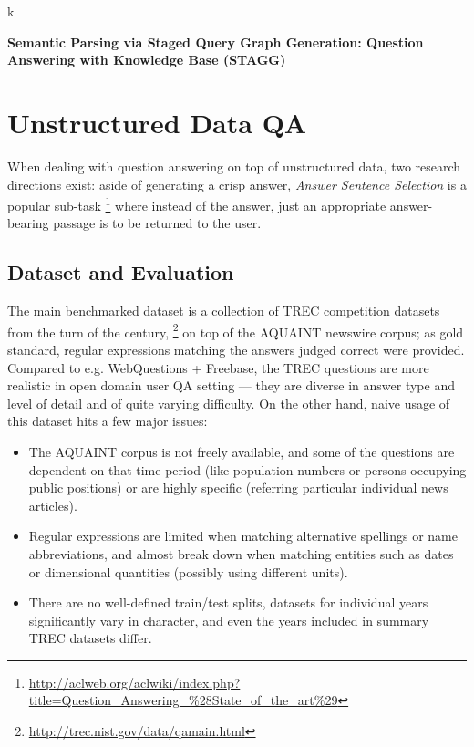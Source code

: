 \citep{Semantic2014Bordes}

\citep{FreebaseQA2014Yao}

\citep{MTBao2014}
k

\citep{Aqqu}

\textbf{Semantic Parsing via Staged Query Graph Generation: Question Answering with Knowledge Base (STAGG)} \citep{STAGG}



\section{Unstructured Data QA}
\label{sec:unstructured}

When dealing with question answering on top of unstructured data,
two research directions exist: aside of generating a crisp answer,
\textit{Answer Sentence Selection} is a popular sub-task%
\footnote{\url{http://aclweb.org/aclwiki/index.php?title=Question_Answering_\%28State_of_the_art\%29}}
where instead of the answer, just an appropriate answer-bearing passage
is to be returned to the user.

\subsection{Dataset and Evaluation}

The main benchmarked dataset is a collection of TREC competition datasets
from the turn of the century,%
\footnote{\url{http://trec.nist.gov/data/qamain.html}}
on top of the AQUAINT newswire corpus;
as gold standard,
regular expressions matching the answers judged correct were provided.
Compared to e.g. WebQuestions + Freebase, the TREC questions
are more realistic in open domain user QA setting --- they are diverse
in answer type and level of detail and of quite varying difficulty.
On the other hand, naive usage of this dataset hits a few major issues:

\begin{itemize}
	\item The AQUAINT corpus is not freely available, and some of the questions are dependent on that time period (like population numbers or persons occupying public positions) or are highly specific (referring particular individual news articles).
	\item Regular expressions are limited when matching alternative spellings or name abbreviations, and almost break down when matching entities such as dates or dimensional quantities (possibly using different units).
	\item There are no well-defined train/test splits, datasets for individual years significantly vary in character, and even the years included in summary TREC datasets differ.
\end{itemize}

